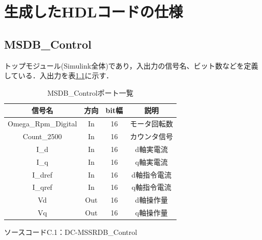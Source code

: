 \chapter{生成したHDLコードの仕様}
\thispagestyle{fancy}
\label{chap:コード}
\section{MSDB\_Control}
トップモジュール(Simulink全体)であり，入出力の信号名、ビット数などを定義している．入出力を表\ref{for:MSDB_Control}に示す．
\begin{table}[h]
 \center
 \caption{MSDB\_Controlポート一覧}
 \label{for:MSDB_Control}
 \small
 \begin{tabular}{c|c|c|c} \hline \hline
  信号名            &   方向    &   bit幅   &   説明   \\ \hline
  Omega\_Rpm\_Digital &   In      &   16      &   モータ回転数   \\ \hline
  Count\_2500       &   In      &   16      &   カウンタ信号   \\ \hline
  I\_d              &   In      &   16      &   d軸実電流   \\ \hline
  I\_q              &   In      &   16      &   q軸実電流   \\ \hline
  I\_dref           &   In      &   16      &   d軸指令電流   \\ \hline
  I\_qref           &   In      &   16      &   q軸指令電流   \\ \hline
  Vd                &   Out     &   16      &   d軸操作量   \\ \hline
  Vq                &   Out     &   16      &   q軸操作量   \\ \hline
 \end{tabular}
\end{table}

\begin{center}
\label{lisC.1}
    ソースコードC.1：DC-MSSRDB\_Control

\end{center}
